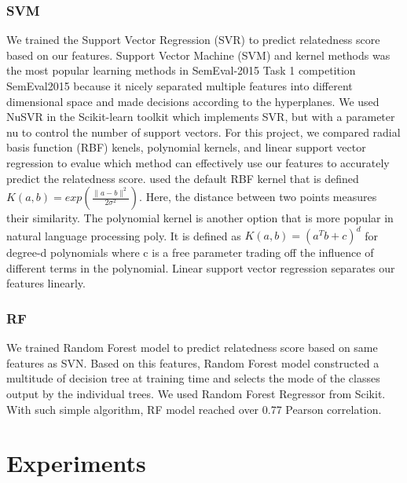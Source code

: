 \documentclass{article} %
\begin{document}
     	\subsubsection{SVM}
We trained the Support Vector Regression (SVR) to predict relatedness score based on our features. Support Vector Machine (SVM) and kernel methods was the most popular learning methods in SemEval-2015 Task 1 competition {SemEval2015} because it nicely separated multiple features into different dimensional space and made decisions according to the hyperplanes. We used NuSVR in the Scikit-learn toolkit which implements SVR, but with a parameter nu to control the number of support vectors. For this project, we compared radial basis function (RBF) kenels, polynomial kernels, and linear support vector regression to evalue which method can effectively use our features to accurately predict the relatedness score. \cite{Abualigah} used the default RBF kernel that is defined $K(a, b) = exp(\frac{ \parallel a-b \parallel ^2}{2 \sigma ^2})$. Here, the distance between two points measures their similarity. The polynomial kernel is another option that is more popular in natural language processing {poly}. It is defined as $K(a, b) = (a^Tb + c)^d$ for degree-d polynomials where c is a free parameter trading off the influence of different terms in the polynomial. Linear support vector regression separates our features linearly.

     	\subsubsection{RF}
We trained Random Forest model to predict relatedness score based on same features as SVN. Based on this features, Random Forest model constructed a multitude of decision tree at training time and selects the mode of the classes output by the individual trees. We used Random Forest Regressor from Scikit. With such simple algorithm, RF model reached over 0.77 Pearson correlation.

	\section{Experiments}
    
\end{document}
